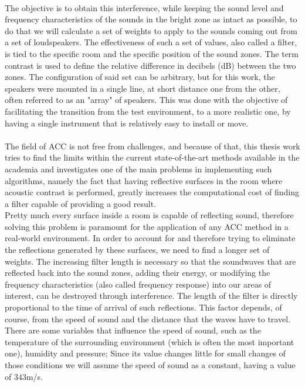 \\
The objective is to obtain this interference, while keeping the sound level and frequency characteristics of the sounds in the bright zone as intact as possible, to do that we will calculate a set of weights to apply to the sounds coming out from a set of loudspeakers. The effectiveness of such a set of values, also called a filter, is tied to the specific room and the specific position of the sound zones. The term contrast is used to define the relative difference in decibels (dB) between the two zones. The configuration of said set can be arbitrary, but for this work, the speakers were mounted in a single line, at short distance one from the other, often referred to as an "array" of speakers. This was done with the objective of facilitating the transition from the test environment, to a more realistic one, by having a single instrument that is relatively easy to install or move.
\\
\\
The field of ACC is not free from challenges, and because of that, this thesis work tries to find the limits within the current state-of-the-art methods available in the academia and investigates one of the main problems in implementing such algorithms, namely the fact that having reflective surfaces in the room where acoustic contrast is performed, greatly increases the computational cost of finding a filter capable of providing a good result.
\\
Pretty much every surface inside a room is capable of reflecting sound, therefore solving this problem is paramount for the application of any ACC method in a real-world environment. In order to account for and therefore trying to eliminate the reflections generated by these surfaces, we need to find a longer set of weights. The increasing filter length is necessary so that the soundwaves that are reflected back into the sound zones, adding their energy, or modifying the frequency characteristics (also called frequency response) into our areas of interest, can be destroyed through interference. The length of the filter is directly proportional to the time of arrival of such reflections. This factor depends, of course, from the speed of sound and the distance that the waves have to travel. There are some variables that influence the speed of sound, such as the temperature of the surrounding environment (which is often the most important one), humidity and pressure; Since its value changes little for small changes of those conditions we will assume the speed of sound as a constant, having a value of $343$m/s.
